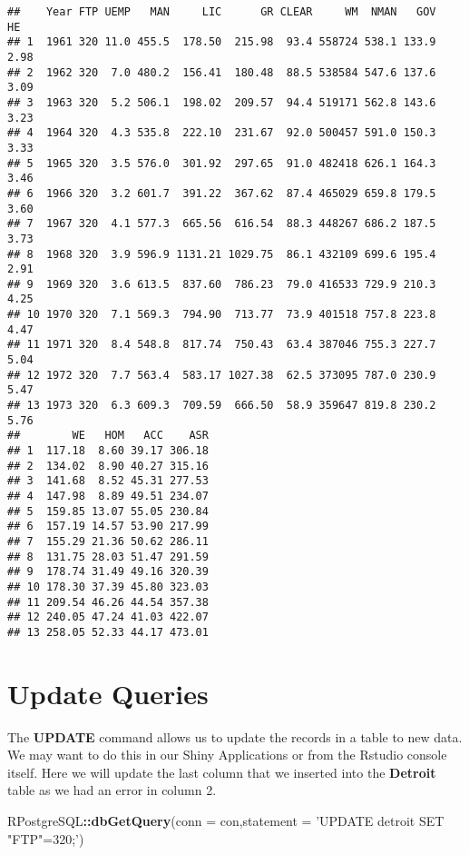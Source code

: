 \documentclass[]{book}
\newenvironment{Shaded}{\begin{snugshade}}{\end{snugshade}}
\newcommand{\KeywordTok}[1]{\textcolor[rgb]{0.13,0.29,0.53}{\textbf{#1}}}
\newcommand{\DataTypeTok}[1]{\textcolor[rgb]{0.13,0.29,0.53}{#1}}
\newcommand{\StringTok}[1]{\textcolor[rgb]{0.31,0.60,0.02}{#1}}
\newcommand{\OperatorTok}[1]{\textcolor[rgb]{0.81,0.36,0.00}{\textbf{#1}}}
\newcommand{\NormalTok}[1]{#1}
\begin{document}
\begin{verbatim}
##    Year FTP UEMP   MAN     LIC      GR CLEAR     WM  NMAN   GOV   HE
## 1  1961 320 11.0 455.5  178.50  215.98  93.4 558724 538.1 133.9 2.98
## 2  1962 320  7.0 480.2  156.41  180.48  88.5 538584 547.6 137.6 3.09
## 3  1963 320  5.2 506.1  198.02  209.57  94.4 519171 562.8 143.6 3.23
## 4  1964 320  4.3 535.8  222.10  231.67  92.0 500457 591.0 150.3 3.33
## 5  1965 320  3.5 576.0  301.92  297.65  91.0 482418 626.1 164.3 3.46
## 6  1966 320  3.2 601.7  391.22  367.62  87.4 465029 659.8 179.5 3.60
## 7  1967 320  4.1 577.3  665.56  616.54  88.3 448267 686.2 187.5 3.73
## 8  1968 320  3.9 596.9 1131.21 1029.75  86.1 432109 699.6 195.4 2.91
## 9  1969 320  3.6 613.5  837.60  786.23  79.0 416533 729.9 210.3 4.25
## 10 1970 320  7.1 569.3  794.90  713.77  73.9 401518 757.8 223.8 4.47
## 11 1971 320  8.4 548.8  817.74  750.43  63.4 387046 755.3 227.7 5.04
## 12 1972 320  7.7 563.4  583.17 1027.38  62.5 373095 787.0 230.9 5.47
## 13 1973 320  6.3 609.3  709.59  666.50  58.9 359647 819.8 230.2 5.76
##        WE   HOM   ACC    ASR
## 1  117.18  8.60 39.17 306.18
## 2  134.02  8.90 40.27 315.16
## 3  141.68  8.52 45.31 277.53
## 4  147.98  8.89 49.51 234.07
## 5  159.85 13.07 55.05 230.84
## 6  157.19 14.57 53.90 217.99
## 7  155.29 21.36 50.62 286.11
## 8  131.75 28.03 51.47 291.59
## 9  178.74 31.49 49.16 320.39
## 10 178.30 37.39 45.80 323.03
## 11 209.54 46.26 44.54 357.38
## 12 240.05 47.24 41.03 422.07
## 13 258.05 52.33 44.17 473.01
\end{verbatim}

\section{Update Queries}\label{update-queries}

The \textbf{UPDATE} command allows us to update the records in a table
to new data. We may want to do this in our Shiny Applications or from
the Rstudio console itself. Here we will update the last column that we
inserted into the \textbf{Detroit} table as we had an error in column 2.

\begin{Shaded}
\begin{Highlighting}[]
\NormalTok{RPostgreSQL}\OperatorTok{::}\KeywordTok{dbGetQuery}\NormalTok{(}\DataTypeTok{conn =}\NormalTok{ con,}\DataTypeTok{statement =} \StringTok{'UPDATE detroit SET "FTP"=320;'}\NormalTok{)}
\end{Highlighting}
\end{Shaded}
\end{document}
